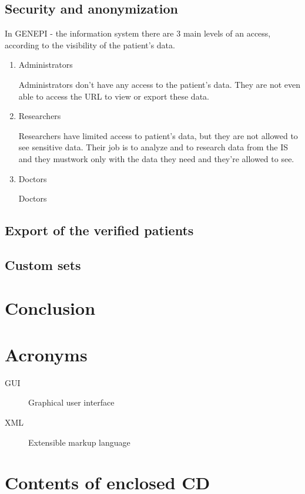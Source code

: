 \documentclass[thesis=B,english]{FITthesis}[2012/10/20]
\begin{document}
\section{Security and anonymization}
In GENEPI - the information system there are 3 main levels of an access, according to the visibility of the patient's data.
\begin{enumerate}
\item{Administrators}

Administrators don't have any access to the patient's data. They are not even able to access the URL to view or export these data.
\item{Researchers}

Researchers have limited access to patient's data, but they are not allowed to see sensitive data.  Their job is to analyze and to research data from the IS and they mustwork only with the data they need and they're allowed to see.
\item{Doctors}

Doctors 
\end{enumerate}
\section{Export of the verified patients}
\section{Custom sets}
\chapter{Conclusion}




\appendix

\chapter{Acronyms}
\begin{description}
	\item[GUI] Graphical user interface
	\item[XML] Extensible markup language
\end{description}


\chapter{Contents of enclosed CD}


\begin{figure}
\end{figure}
\end{document}
